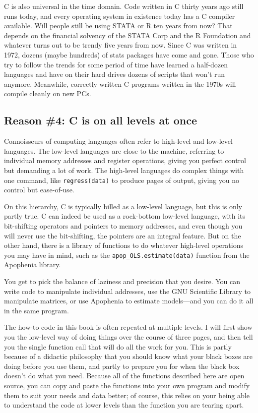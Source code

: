 C is also universal in the time domain. Code written in C thirty years
ago still runs today, and every operating system in existence today has a C
compiler available. Will people still be using STATA or R ten years from now?
That depends on the financial solvency of the STATA Corp and the
R Foundation and whatever turns out to be trendy five years from now.
Since C was written in 1972, dozens (maybe hundreds) of stats packages
have come and gone. Those who try to follow the trends for
some period of time have learned a half-dozen languages
and have on their hard drives dozens of scripts that won't run anymore.
Meanwhile, correctly written C programs written in the 1970s will
compile cleanly on new PCs.


\ifbook
\subsection{Reason \#4: C is on all levels at once} 
Connoisseurs of computing languages often refer to high-level and low-level languages. The low-level
languages are close to the machine, referring to individual memory
addresses and register operations, giving you perfect control but demanding a lot
of work. The high-level languages do
complex things with one command, like {\tt regress(data)} to produce
pages of output, giving you no control but ease-of-use.

On this hierarchy, C is typically billed as a low-level language, but this is only
partly true. C can indeed be used as a rock-bottom low-level language,
with its bit-shifting operators and pointers to memory addresses, and
even though you will never use the bit-shifting, the pointers are an
integral feature. But on the other hand, there is a library of functions
to do whatever high-level operations you may have in mind, such as the
{\tt apop\_OLS.estimate(data)} function from the Apophenia library.

You get to pick the balance of laziness and precision that you desire. You
can write code to manipulate individual addresses, use the GNU Scientific
Library to manipulate matrices, or use Apophenia to estimate models---and
you can do it all in the same program.

The how-to code in this book is often repeated at multiple levels. I will first
show you the low-level way of doing things over the course of three
pages, and then tell you the single function call that will do all the work
for you. This is partly because of a didactic philosophy that you should
know what your black boxes are doing before you use them, and partly
to prepare you for when the black box doesn't do what you need. Because all of the
functions described here are open source, you can copy and paste the
functions into your own program and modify them to suit your needs
and data better; of course, this relies on your being able to understand
the code at lower levels than the function you are tearing apart.
\fi
